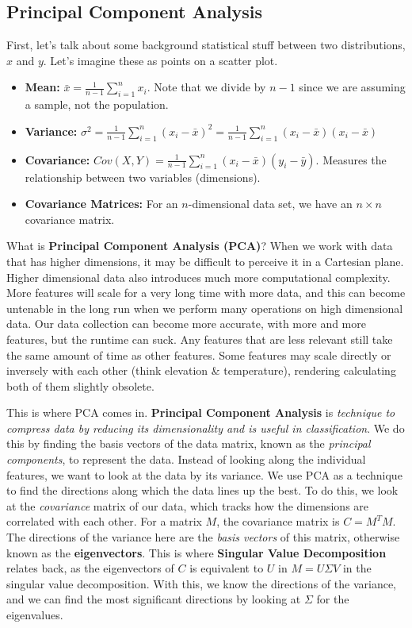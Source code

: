 \documentclass{article}
\begin{document}
\subsection{Principal Component Analysis}
First, let's talk about some background statistical stuff between two distributions, $x$ and $y$. Let's imagine these as points on a scatter plot. 
\begin{itemize}
    \item \textbf{Mean:} $\bar{x} = \frac{1}{n-1}\sum^n_{i=1}x_i$. Note that we divide by $n-1$ since we are assuming a sample, not the population. 
    \item \textbf{Variance:} $\sigma^2 = \frac{1}{n-1}\sum^n_{i=1}(x_i-\bar{x})^2 = \frac{1}{n-1}\sum^n_{i=1}(x_i-\bar{x})(x_i-\bar{x})$
    \item \textbf{Covariance:} $Cov(X,Y) = \frac{1}{n-1}\sum^n_{i=1}(x_i-\bar{x})(y_i-\bar{y})$. Measures the relationship between two variables (dimensions).
    \item \textbf{Covariance Matrices:} For an $n$-dimensional data set, we have an $n\times n$ covariance matrix. 
\end{itemize}
What is \textbf{Principal Component Analysis (PCA)}? When we work with data that has higher dimensions, it may be difficult to perceive it in a Cartesian plane. Higher dimensional data also introduces much more computational complexity. More features will scale for a very long time with more data, and this can become untenable in the long run when we perform many operations on high dimensional data. Our data collection can become more accurate, with more and more features, but the runtime can suck. Any features that are less relevant still take the same amount of time as other features. Some features may scale directly or inversely with each other (think elevation & temperature), rendering calculating both of them slightly obsolete. 

\newline
\newline

This is where PCA comes in. \textbf{Principal Component Analysis} is \textit{technique to compress data by reducing its dimensionality and is useful in classification}. We do this by finding the basis vectors of the data matrix, known as the \textit{principal components}, to represent the data. Instead of looking along the individual features, we want to look at the data by its variance. We use PCA as a technique to find the directions along which the data lines up the best. To do this, we look at the \textit{covariance} matrix of our data, which tracks how the dimensions are correlated with each other. For a matrix $M$, the covariance matrix is $C = M^TM$. The directions of the variance here are the \textit{basis vectors} of this matrix, otherwise known as the \textbf{eigenvectors}. This is where \textbf{Singular Value Decomposition} relates back, as the eigenvectors of $C$ is equivalent to $U$ in $M = U\Sigma V$ in the singular value decomposition. With this, we know the directions of the variance, and we can find the most significant directions by looking at $\Sigma$ for the eigenvalues. 
\end{document}
